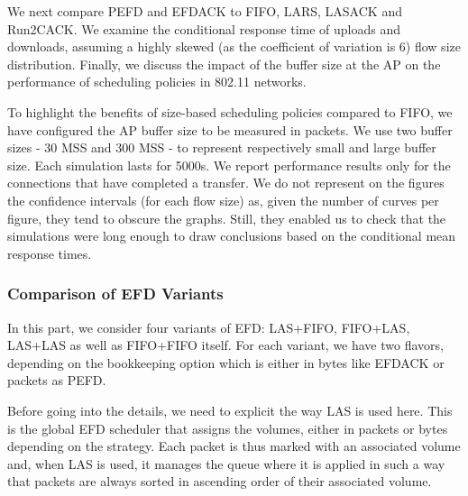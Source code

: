 \documentclass[preprint,12pt]{elsarticle}
\begin{document}
We next compare PEFD and EFDACK to FIFO, LARS, LASACK and Run2CACK.  We examine the conditional response time of uploads and downloads, assuming a highly skewed (as the coefficient of variation is 6) flow size distribution.  Finally, we discuss the impact of the buffer size at the AP on the performance of scheduling policies in 802.11 networks. 

To highlight the benefits of size-based scheduling policies compared to FIFO, we have configured the AP buffer size to be measured in packets. We use two buffer sizes - 30 MSS and 300 MSS - to represent respectively small and large buffer size. Each simulation lasts for 5000s. %
We report performance results only for the connections that have completed a transfer. We do not represent on the figures the confidence intervals  (for each flow size) as, given the number of curves per figure, they tend to obscure the graphs. Still, they enabled us to check that the simulations were long enough to draw conclusions based on the conditional mean response times. 

\subsubsection{Comparison of EFD Variants} \label{section:4schemes}

In this part, we consider four variants of EFD: LAS+FIFO, FIFO+LAS, LAS+LAS as well as FIFO+FIFO itself. For each variant, we have two flavors, depending on the bookkeeping option which is either in bytes like EFDACK or packets as PEFD.%

Before going into the details, we need to explicit the way LAS is used here. This is the global EFD scheduler that assigns the volumes, either in packets or bytes depending on the strategy. Each packet is thus marked with an associated volume and, when LAS is used, it manages the queue where it is applied in such a way that packets are always sorted in ascending order of their associated volume.
\end{document}
